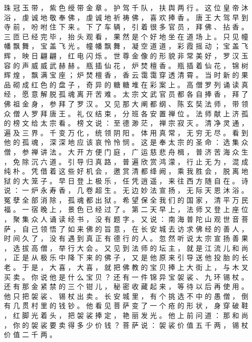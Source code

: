 {珠 冠 玉 带 ， 紫 色 绶 带 金 章 。
护 驾 千 队 ， 扶 舆 两 行 。
这 位 皇 帝 沐 浴 ， 虔 诚 地 敬 奉 佛 ， 虔 诚 地 祈 祷 佛 ， 喜 欢 捧 香 。
唐 王 大 驾 早 到 寺 前 ， 吩 咐 住 下 来 。
下 了 车 辆 ， 引 着 很 多 官 员 ， 拜 佛 、 拈 香 。
三 匝 已 经 完 毕 ， 抬 头 观 看 ， 果 然 是 个 好 地 坐 在 道 场 上 。
只 见 幢 幡 飘 舞 ， 宝 盖 飞 光 。
幢 幡 飘 舞 ， 凝 空 道 道 ， 彩 霞 摇 动 ； 宝 盖 飞 辉 ， 映 日 翩 翩 ， 红 电 闪 烁 。
世 尊 金 像 的 形 貌 非 常 美 好 ， 罗 汉 玉 容 的 声 威 威 武 赫 赫 。
瓶 插 仙 花 ， 炉 焚 檀 香 。
瓶 插 着 仙 花 ， 锦 树 辉 煌 ， 飘 满 宝 座 ； 炉 焚 檀 香 ， 香 云 霭 霭 穿 透 清 霄 。
当 时 新 的 果 品 砌 成 红 色 的 盘 子 ， 奇 异 的 糖 糖 堆 在 彩 案 上 。
高 僧 罗 列 诵 读 真 经 ， 愿 意 解 脱 孤 魂 离 开 苦 难 。
太 宗 文 武 官 员 都 各 自 捧 香 ， 拜 了 佛 祖 金 身 ， 参 拜 了 罗 汉 。
又 见 那 大 阐 都 纲 、 陈 玄 奘 法 师 ， 带 领 众 僧 人 罗 拜 唐 王 。
礼 仪 结 束 ， 分 班 各 安 置 禅 位 。
法 师 献 上 济 孤 的 榜 文 给 太 宗 看 。
榜 文 说 ： 至 德 渺 茫 ， 禅 宗 寂 灭 。
清 净 灵 通 ， 遍 及 三 界 。
千 变 万 化 ， 统 领 阴 阳 。
体 用 真 常 ， 无 穷 无 尽 。
看 到 他 的 孤 魂 ， 深 深 地 应 该 哀 怜 怜 悯 。
这 是 奉 太 宗 的 圣 命 ： 选 集 众 僧 ， 参 禅 讲 法 。
大 开 方 便 门 庭 ， 广 运 慈 悲 舟 楫 ， 普 济 苦 海 众 生 ， 免 除 沉 六 道 。
引 导 归 真 路 ， 普 遍 欣 赏 鸿 濛 ， 行 止 无 为 ， 混 成 纯 朴 。
凭 借 着 这 些 好 机 会 ， 邀 赏 清 都 绛 阙 ， 乘 我 胜 会 ， 脱 离 地 狱 的 大 笼 子 。
早 日 登 上 极 乐 ， 任 凭 逍 遥 ， 来 往 西 方 随 自 在 。
诗 说 ： 一 炉 永 寿 香 ， 几 卷 超 生 。
无 边 妙 法 宣 扬 ， 无 际 天 恩 沐 浴 。
冤 孽 全 部 消 除 ， 孤 魂 都 出 狱 。
希 望 保 全 我 们 的 国 家 ， 清 平 万 民 福 。
一 宿 晚 上 ， 景 色 已 经 过 了 。
第 二 天 早 上 ， 法 师 又 登 上 座 位 ， 聚 集 众 人 诵 读 经 书 ， 没 有 题 字 。
又 说 ： 南 海 普 陀 山 观 世 音 菩 萨 ， 自 己 领 悟 了 如 来 佛 的 旨 意 ， 在 长 安 城 去 访 求 佛 经 的 善 人 ， 时 间 久 了 ， 没 有 遇 到 真 正 有 德 行 的 人 。
忽 然 听 说 太 宗 宣 扬 善 果 ， 选 拔 高 僧 ， 举 行 大 会 。
又 见 到 法 师 的 坛 主 ， 就 是 江 流 儿 和 尚 ， 正 是 从 极 乐 中 降 下 来 的 佛 子 ， 又 是 他 原 来 引 导 送 他 投 胎 的 长 老 。
于 是 ， 大 喜 ， 大 喜 ， 就 把 佛 教 的 宝 贝 捧 上 大 街 上 ， 与 木 叉 买 卖 。
你 说 他 是 什 么 宝 贝 ？ 还 有 一 件 锦 异 宝 袈 裟 、 九 环 锡 杖 。
还 有 那 金 紧 禁 的 三 个 钳 儿 ， 秘 密 收 藏 起 来 ， 等 待 以 后 再 使 用 。
他 只 把 袈 裟 、 锡 杖 出 卖 。
长 安 城 里 ， 有 个 挑 选 不 中 的 愚 僧 ， 倒 有 几 贯 村 里 的 钱 钞 。
他 看 见 菩 萨 变 了 一 个 疮 的 形 状 ， 身 穿 破 鞋 ， 红 脚 光 着 头 ， 把 袈 裟 捧 定 ， 艳 丽 发 光 。 他 上 前 问 道 ： 那 和 尚 ， 你 的 袈 裟 要 卖 得 多 少 价 钱 ？ 菩 萨 说 ： 袈 裟 价 值 五 千 两 ， 锡 杖 价 值 二 千 两 。
}
